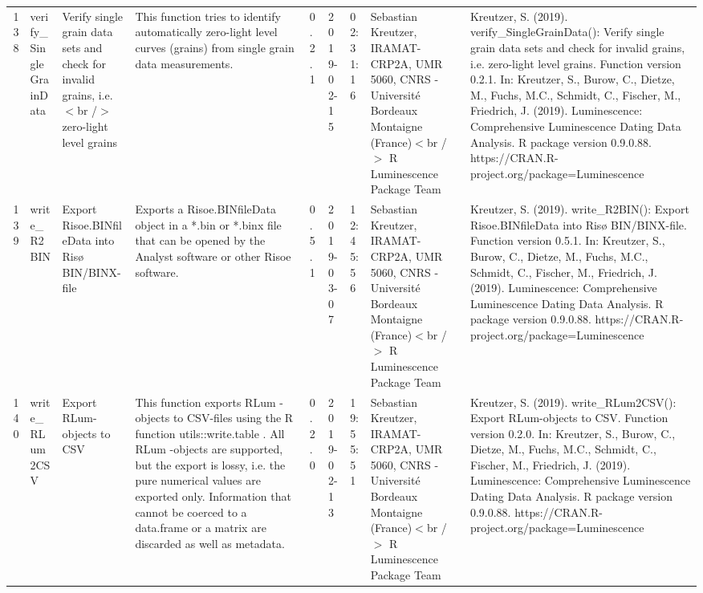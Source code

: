 \begin{table}[ht]
\begin{tabular}{rllllllll}
 \\ 
  138 & verify\_SingleGrainData & Verify single grain data sets and check for invalid grains, i.e.$<$br /$>$ zero-light level grains & This function tries to identify automatically zero-light level curves (grains) from single grain data measurements. & 0.2.1 & 2019-02-15 & 02:31:16
 & Sebastian Kreutzer, IRAMAT-CRP2A, UMR 5060, CNRS - Université Bordeaux Montaigne (France)$<$br /$>$  R Luminescence Package Team & Kreutzer, S. (2019). verify\_SingleGrainData(): Verify single grain data sets and check for invalid grains, i.e. zero-light level grains. Function version 0.2.1. In: Kreutzer, S., Burow, C., Dietze, M., Fuchs, M.C., Schmidt, C., Fischer, M., Friedrich, J. (2019). Luminescence: Comprehensive Luminescence Dating Data Analysis. R package version 0.9.0.88. https://CRAN.R-project.org/package=Luminescence
 \\ 
  139 & write\_R2BIN & Export Risoe.BINfileData into Risø BIN/BINX-file & Exports a Risoe.BINfileData object in a *.bin or *.binx file that can be opened by the Analyst software or other Risoe software. & 0.5.1 & 2019-03-07 & 12:45:56
 & Sebastian Kreutzer, IRAMAT-CRP2A, UMR 5060, CNRS - Université Bordeaux Montaigne (France)$<$br /$>$  R Luminescence Package Team & Kreutzer, S. (2019). write\_R2BIN(): Export Risoe.BINfileData into Risø BIN/BINX-file. Function version 0.5.1. In: Kreutzer, S., Burow, C., Dietze, M., Fuchs, M.C., Schmidt, C., Fischer, M., Friedrich, J. (2019). Luminescence: Comprehensive Luminescence Dating Data Analysis. R package version 0.9.0.88. https://CRAN.R-project.org/package=Luminescence
 \\ 
  140 & write\_RLum2CSV & Export RLum-objects to CSV & This function exports  RLum -objects to CSV-files using the R function utils::write.table . All  RLum -objects are supported, but the export is lossy, i.e. the pure numerical values are exported only. Information that cannot be coerced to a  data.frame  or a  matrix  are discarded as well as metadata. & 0.2.0 & 2019-02-13 & 19:55:51
 & Sebastian Kreutzer, IRAMAT-CRP2A, UMR 5060, CNRS - Université Bordeaux Montaigne (France)$<$br /$>$  R Luminescence Package Team & Kreutzer, S. (2019). write\_RLum2CSV(): Export RLum-objects to CSV. Function version 0.2.0. In: Kreutzer, S., Burow, C., Dietze, M., Fuchs, M.C., Schmidt, C., Fischer, M., Friedrich, J. (2019). Luminescence: Comprehensive Luminescence Dating Data Analysis. R package version 0.9.0.88. https://CRAN.R-project.org/package=Luminescence
 \\ 
   \hline
\end{tabular}
\end{table}

